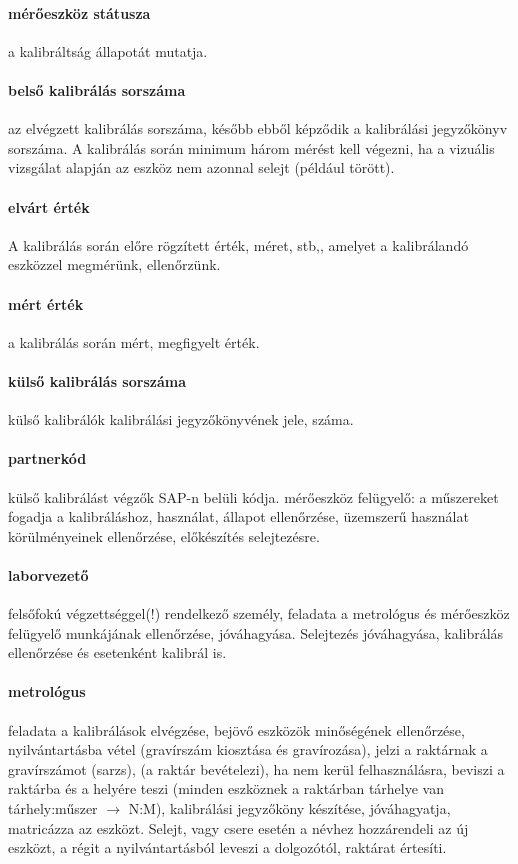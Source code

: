\paragraph*{mérőeszköz státusza} a kalibráltság állapotát mutatja.

\paragraph*{belső kalibrálás sorszáma} az elvégzett kalibrálás sorszáma, később ebből képződik a kalibrálási jegyzőkönyv sorszáma. A kalibrálás során minimum három mérést
kell végezni, ha a vizuális vizsgálat alapján az eszköz nem azonnal selejt (például törött).

\paragraph*{elvárt érték} A kalibrálás során előre rögzített érték, méret, stb,, amelyet a kalibrálandó eszközzel megmérünk, ellenőrzünk.

\paragraph*{mért érték} a kalibrálás során mért, megfigyelt érték.

\paragraph*{külső kalibrálás sorszáma}  külső kalibrálók kalibrálási jegyzőkönyvének
jele, száma.

\paragraph*{partnerkód} külső kalibrálást végzők SAP-n belüli kódja.
mérőeszköz felügyelő:	a műszereket fogadja a kalibráláshoz, használat, állapot 
ellenőrzése, üzemszerű használat körülményeinek ellenőrzése, előkészítés selejtezésre.

\paragraph*{laborvezető}	felsőfokú végzettséggel(!) rendelkező személy, feladata a
metrológus és mérőeszköz felügyelő munkájának ellenőrzése, jóváhagyása. Selejtezés
jóváhagyása, kalibrálás ellenőrzése és esetenként kalibrál is.

\paragraph*{metrológus} feladata a kalibrálások elvégzése, bejövő eszközök
minőségének ellenőrzése, nyilvántartásba vétel (gravírszám kiosztása és gravírozása),
jelzi a raktárnak a gravírszámot (sarzs), (a raktár bevételezi), ha nem kerül felhasználásra, 
beviszi a raktárba és a helyére teszi (minden eszköznek a raktárban tárhelye van
tárhely:műszer $\rightarrow$ N:M), kalibrálási jegyzőköny készítése, jóváhagyatja, matricázza az eszközt. Selejt, vagy csere esetén a névhez hozzárendeli az új eszközt, a régit a nyilvántartásból leveszi a dolgozótól, raktárat értesíti.


